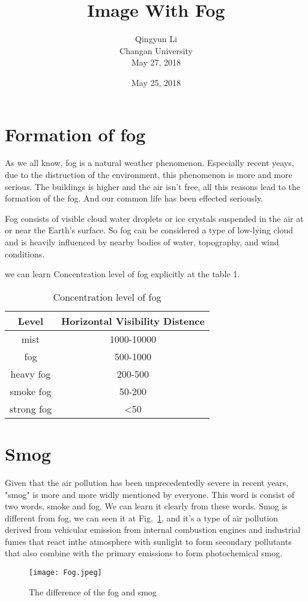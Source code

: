 \documentclass[10pt,twocolumn,letterpaper]{article}
\author{Qingyun Li\\
Changan University\\
May 27, 2018}
\date{May 25, 2018}
\title{Image With Fog}
\begin{document}
\maketitle

\section{Formation of fog}
 \par As we all know, fog is a natural weather phenomenon. Especially recent yeays, due to the distruction of the   environment, this phenomenon is more and more serious. The buildings is higher and the air isn't free, all this reasons lead to the formation of the fog. And our common life has been effected seriously. 
 \par Fog consists of visible cloud water droplets or ice crystals suspended in the air at or near the Earth's surface\cite{gultepe2008fog}. So fog can be considered a type of low-lying cloud and is heavily influenced by nearby bodies of water, topography, and wind conditions.
 \par we can learn Concentration level of fog explicitly at the table 1.
\begin{table}[htbp]
\centering
\caption{Concentration level of fog}
\begin{tabular}{c|c}
\hline
Level & Horizontal Visibility Distence \\
\hline
mist & 1000-10000 \\
fog & 500-1000 \\
heavy fog & 200-500 \\
smoke fog & 50-200 \\
strong fog & <50 \\
\hline 
\end{tabular} 
\end{table}
\section{Smog}
 \par Given that the air pollution has been unprecedentedly severe in recent years, "smog" is more and more widly mentioned by everyone. This word is consist of two words, smoke and fog. We can learn it clearly from these words. Smog is different from fog, we can seen it at Fig.~\ref{difference}, and it's a type of air pollution derived from vehicular emission from internal combustion engines and industrial fumes that react inthe atmosphere with sunlight to form secondary pollutants that also combine with the primary emissions to form photochemical smog.
\begin{figure}[t]
\begin{center}
\texttt{[image: Fog.jpeg]} %
\end{center}
   \caption{The difference of the fog and smog}
\label{difference}
\end{figure}
\end{document}
